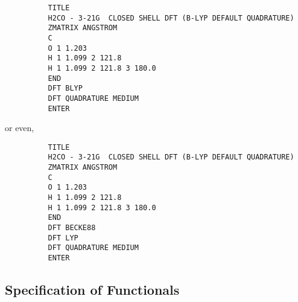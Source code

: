 \documentclass[11pt,fleqn]{article}
\begin{document}
{
\footnotesize
\begin{verbatim}
          TITLE
          H2CO - 3-21G  CLOSED SHELL DFT (B-LYP DEFAULT QUADRATURE)
          ZMATRIX ANGSTROM
          C
          O 1 1.203
          H 1 1.099 2 121.8
          H 1 1.099 2 121.8 3 180.0
          END
          DFT BLYP 
          DFT QUADRATURE MEDIUM
          ENTER
\end{verbatim}
}
or even,

{
\footnotesize
\begin{verbatim}
          TITLE
          H2CO - 3-21G  CLOSED SHELL DFT (B-LYP DEFAULT QUADRATURE)
          ZMATRIX ANGSTROM
          C
          O 1 1.203
          H 1 1.099 2 121.8
          H 1 1.099 2 121.8 3 180.0
          END
          DFT BECKE88
          DFT LYP
          DFT QUADRATURE MEDIUM
          ENTER
\end{verbatim}
}

\subsection{Specification of Functionals}
\end{document}
